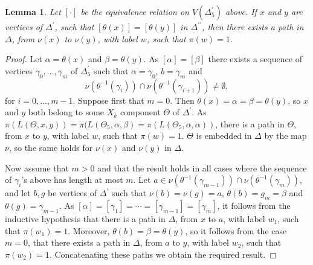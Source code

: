 \documentclass[a4paper,12pt]{article}
\renewcommand{\a}{\alpha }
\renewcommand{\b}{\beta }
\newcommand{\g}{\gamma }
\newcommand{\D}{\Delta }
\newcommand{\nul}{\emptyset }
\newtheorem{lemma}[theorem]{Lemma}
\numberwithin{equation}{section}
\numberwithin{figure}{section}
\begin{document}
\begin{lemma}\label{lem:idverts}
Let $[\cdot]$ be the equivalence relation on $V(\D^\prime_5)$ above.
If $x$ and $y$ are vertices of $\D^\prime$, such that 
$[\theta(x)]=[\theta(y)]$ in $\D^{\prime\prime}$, then 
there exists a path in $\D$, from $\nu(x)$ to $\nu(y)$, with label $w$,
such that $\pi(w)=1$. 
\end{lemma}
\begin{proof}
Let $\a=\theta(x)$ and $\b=\theta(y)$. As $[\a]=[\b]$ there exists a
sequence of vertices $\g_0,\ldots ,\g_m$ of $\D^\prime_5$ such that 
$\a=\g_0$, $b=\g_m$ and 
\[\nu(\theta^{-1}(\g_i))\cap \nu(\theta^{-1}(\g_{i+1}))\neq \nul,\]
for $i=0,\ldots, m-1$. Suppose first that $m=0$. Then $\theta(x)=
\a=\b=\theta(y)$, so $x$ and $y$ both belong to some $X_k$ component
$\Theta$ of $\D^\prime$. As $\pi(L(\Theta,x,y))=\pi(L(\Theta_5, \a,\b)
=\pi(L(\Theta_5,\a,\a))$, there is a path in $\Theta$, from $x$ to $y$,
with label $w$, such that $\pi(w)=1$. $\Theta$ is embedded in $\D$ by the
map $\nu$, so the same holds for $\nu(x)$ and $\nu(y)$ in $\D$. 

Now assume that $m>0$ and that the result holds in all cases where the
sequence of $\g_i$'s above has length at most  $m$. Let 
$a\in  \nu(\theta^{-1}(\g_{m-1}))\cap \nu(\theta^{-1}(\g_{m}))$, and let 
$b,g$ be vertices of $\D^\prime$ such that $\nu(b)=\nu(g)=a$,   
$\theta(b)=g_m=\b$ and $\theta(g)=\g_{m-1}$. As $[\a]=[\g_1]=\cdots 
=[\g_{m-1}]=[\g_m]$, it follows from the inductive hypothesis that 
there is a path in $\D$, from $x$ to $a$, with label $w_1$, such
that $\pi(w_1)=1$. Moreover, $\theta(b)=\b=\theta(y)$, so it follows from
the case $m=0$, that there exists a path in $\D$, from $a$ to $y$,
with label $w_2$, such that $\pi(w_2)=1$. Concatenating these paths we
obtain the required result.
\end{proof}
\end{document}
